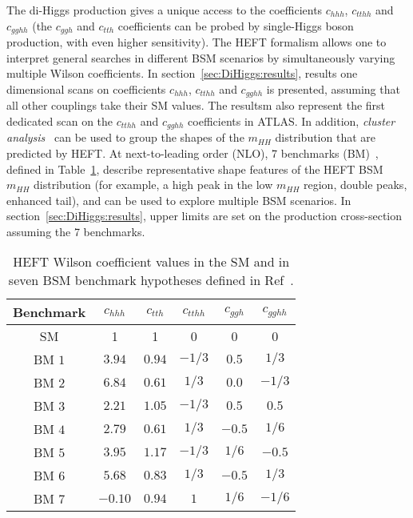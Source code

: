 The di-Higgs production gives a unique access to the coefficients 
$c_{hhh}$, $c_{tthh}$ and $c_{gghh}$ (the $c_{ggh}$ and $c_{tth}$ coefficients can be probed
by single-Higgs boson production, with even higher sensitivity). 
The HEFT formalism allows one to interpret general searches in different BSM scenarios 
by simultaneously varying multiple Wilson coefficients. 
In section~\ref{sec:DiHiggs:results}, results one dimensional scans on
coefficients $c_{hhh}$, $c_{tthh}$ and $c_{gghh}$ is presented, assuming that 
all other couplings take their SM values.
The resultsm also represent the first dedicated scan on the $c_{tthh}$ and $c_{gghh}$
coefficients in ATLAS.
In addition, \textit{cluster analysis}~\cite{Carvalho:2015ttv} can be used 
to group the shapes of the $m_{HH}$ distribution that are predicted by HEFT. 
At next-to-leading order (NLO), 7 benchmarks (BM)~\cite{Capozi:2019xsi}, 
defined in Table~\ref{tab:bm}, describe representative shape features of the 
HEFT BSM $m_{HH}$ distribution 
(for example, a high peak in the low $m_{HH}$ region, double peaks, enhanced tail),
and can be used to explore multiple BSM scenarios. 
In section~\ref{sec:DiHiggs:results}, upper limits are set on the production cross-section
assuming the 7 benchmarks. 


\begin{table}[tbh!]
  \begin{center}
    \begin{tabular}{c|c c c c c}
      \toprule
      Benchmark & $c_{hhh}$ & $c_{tth}$ & $c_{tthh}$ & $c_{ggh}$ & $c_{gghh}$ \\ 
      \midrule
      SM  & 1 & 1 & 0 & 0 & 0 \\
      BM $1$ & $3.94$ & $0.94$ & $-1/3$ & $0.5$ & $1/3$ \\
      BM $2$ & $6.84$ & $0.61$ & $1/3$ & $0.0$ & $-1/3$ \\
      BM $3$ & $2.21$ & $1.05$ & $-1/3$ & $0.5$ & $0.5$ \\
      BM $4$ & $2.79$ & $0.61$ & $1/3$ & $-0.5$ & $1/6$ \\
      BM $5$ & $3.95$ & $1.17$ & $-1/3$ & $1/6$ & $-0.5$ \\
      BM $6$ & $5.68$ & $0.83$ & $1/3$ & $-0.5$ & $1/3$ \\
      BM $7$ & $-0.10$ & $0.94$ & $1$ & $1/6$ & $-1/6$ \\
      \bottomrule
    \end{tabular}
  \end{center}
  \caption{HEFT Wilson coefficient values in the SM and in seven BSM 
  benchmark hypotheses defined in Ref~\cite{Capozi:2019xsi}.}
  \label{tab:bm}

\end{table}



